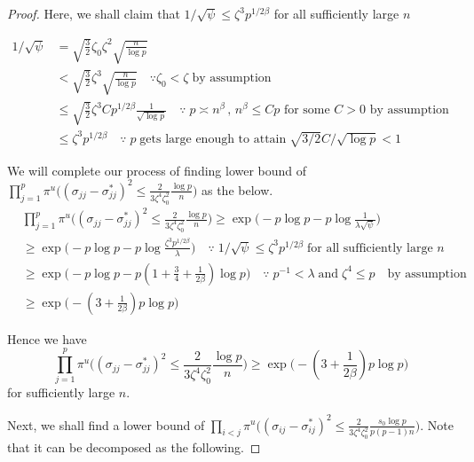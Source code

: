 \begin{proof}
    Here, we shall claim that $1/\sqrt \psi \leq \zeta^3 p^{1/2\beta}$ for all sufficiently large $n$

    \begin{align*}
        1/\sqrt \psi &= \sqrt{\frac 32}\zeta_0 \zeta^2 \sqrt{\frac{n}{\log p}} \\
        &< \sqrt{\frac 32}\zeta^3 \sqrt{\frac{n}{\log p}} \quad \because \zeta_0 < \zeta \; \text{by assumption} \\ 
        &\leq \sqrt{\frac 32}\zeta^3 Cp^{1/2\beta} \frac{1}{\sqrt{\log p}} \quad \because \; p \asymp n^\beta \,,\, n^\beta\leq Cp \text{ for some } C>0 \text{ by assumption } \\
        &\leq \zeta^3p^{1/2\beta} \quad \because \; p \; \text{gets large enough to attain} \; \sqrt{3/2}C/\sqrt{\log p}<1
    \end{align*}

    We will complete our process of finding lower bound of $\prod_{j=1}^p \pi^u\Big((\sigma_{jj}- \sigma_{jj}^*)^2 \leq \frac{2}{3\zeta^4 \zeta_0^2}\frac{\log p}{n} \Big)$ as the below. 
    \begin{align*}
        &\prod_{j=1}^p \pi^u\Big((\sigma_{jj}- \sigma_{jj}^*)^2 \leq \frac{2}{3\zeta^4 \zeta_0^2}\frac{\log p}{n} \Big) \geq \exp\Big(-p \log p - p \log \frac{1}{\lambda\sqrt{\psi}} \Big) \\
        &\geq \exp\Big(-p\log p - p\log \frac{\zeta^3 p^{1/2\beta}}{\lambda} \Big) \quad \because \; 1/\sqrt \psi \leq \zeta^3 p^{1/2\beta} \; \text{for all sufficiently large } n \\
        &\geq \exp\Big(-p \log p - p (1 + \frac 34 + \frac{1}{2\beta})\log p\Big) \quad \because \; p^{-1}<\lambda \; \text{and} \; \zeta^4\leq p \quad \text{by assumption} \\
        &\geq \exp\Big(-(3+\frac{1}{2\beta})p \log p\Big)
    \end{align*}

    Hence we have
    \begin{equation} \label{diagonal ineq}
        \prod_{j=1}^p \pi^u\Big((\sigma_{jj}- \sigma_{jj}^*)^2 \leq \frac{2}{3\zeta^4 \zeta_0^2}\frac{\log p}{n} \Big) \geq \exp\Big(-(3+\frac{1}{2\beta})p \log p\Big)
    \end{equation}
    for sufficiently large $n$.

    Next, we shall find a lower bound of $\prod_{i < j} \pi^u\Big((\sigma_{ij}- \sigma_{ij}^*)^2\leq \frac{2}{3\zeta^4\zeta_0^2}\frac{s_0\log p}{p(p-1)n} \Big)$. Note that it can be decomposed as the following.
    

\end{proof}
